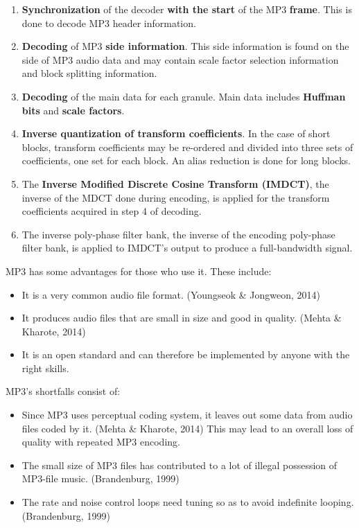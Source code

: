 \documentclass[12pt,svgnames,smaller]{article} %
\begin{document}
\begin{enumerate}
		\begin{enumerate}
			\item \textbf{Synchronization} of the decoder \textbf{with the start} of the MP3 \textbf{frame}. This is done to decode MP3 header information.
			\item \textbf{Decoding} of MP3 \textbf{side information}. This side information is found on the side of MP3 audio data and may contain scale factor selection information and block splitting information.
			\item \textbf{Decoding} of the main data for each granule. Main data includes \textbf{Huffman bits} and \textbf{scale factors}.
			\item \textbf{Inverse quantization of transform coefficients}. In the case of short blocks, transform coefficients may be re-ordered and divided into three sets of coefficients, one set for each block. An alias reduction is done for long blocks.
			\item The \textbf{Inverse Modified Discrete Cosine Transform (IMDCT)}, the inverse of the MDCT done during encoding, is applied for the transform coefficients acquired in step 4 of decoding.
			\item The inverse poly-phase filter bank, the inverse of the encoding poly-phase filter bank, is applied to IMDCT’s output to produce a full-bandwidth signal. 
		\end{enumerate}
		
		MP3 has some advantages for those who use it. These include:
		
		\begin{itemize}
			\item It is a very common audio file format. (Youngseok \& Jongweon, 2014)
			\item It produces audio files that are small in size and good in quality. (Mehta \& Kharote, 2014)
			\item It is an open standard and can therefore be implemented by anyone with the right skills.
		\end{itemize}
		
		MP3’s shortfalls consist of:
		
		\begin{itemize}
			\item Since MP3 uses perceptual coding system, it leaves out some data from audio files coded by it. (Mehta \& Kharote, 2014) This may lead to an overall loss of quality with repeated MP3 encoding.
			\item The small size of MP3 files has contributed to a lot of illegal possession of MP3-file music. (Brandenburg, 1999) 
			\item The rate and noise control loops need tuning so as to avoid indefinite looping. (Brandenburg, 1999)
		\end{itemize}
		

\end{enumerate}
\end{document}
